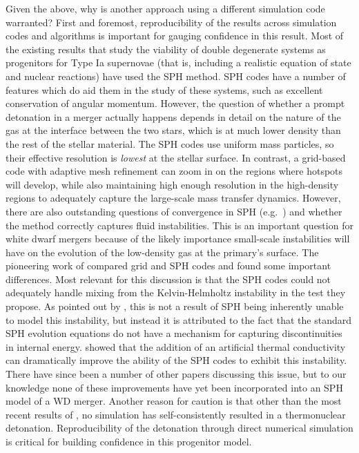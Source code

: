 \documentclass[iop]{../emulateapj}
\begin{document}
Given the above, why is another approach using a different simulation
code warranted? First and foremost, reproducibility of the results
across simulation codes and algorithms is important for gauging
confidence in this result. Most of the existing results that study 
the viability of double degenerate systems as progenitors for
Type Ia supernovae (that is, including a realistic 
equation of state and nuclear reactions) have
used the SPH method. SPH codes have a number of features which do aid
them in the study of these systems, such as excellent conservation of
angular momentum. However, the question of whether a prompt detonation
in a merger actually happens depends in detail on the nature of the
gas at the interface between the two stars, which is at much lower
density than the rest of the stellar material. The SPH codes use
uniform mass particles, so their effective resolution is
\textit{lowest} at the stellar surface. In contrast, a grid-based code
with adaptive mesh refinement can zoom in on the regions where
hotspots will develop, while also maintaining high enough resolution
in the high-density regions to adequately capture the large-scale mass
transfer dynamics. However, there are also outstanding questions of
convergence in SPH (e.g.\ \citealt{zhu_SPH:2014}) and whether the method
correctly captures fluid instabilities. This is an important question
for white dwarf mergers because of the likely importance small-scale
instabilities will have on the evolution of the low-density gas at the
primary's surface. The pioneering work of \cite{agertz:2007} compared
grid and SPH codes and found some important differences. Most relevant
for this discussion is that the SPH codes could not adequately handle
mixing from the Kelvin-Helmholtz instability in the test they
propose. As pointed out by \cite{price:2008}, this is not a result of
SPH being inherently unable to model this instability, but instead it
is attributed to the fact that the standard SPH evolution equations do
not have a mechanism for capturing discontinuities in internal
energy. \citeauthor{price:2008} showed that the addition of an
artificial thermal conductivity can dramatically improve the ability
of the SPH codes to exhibit this instability. There have since been a
number of other papers discussing this issue, but to our knowledge
none of these improvements have yet been incorporated into an SPH
model of a WD merger. Another reason for caution is that other than the
most recent results of \cite{kashyap:2015}, no simulation has self-consistently
resulted in a thermonuclear detonation. Reproducibility of the detonation 
through direct numerical simulation is critical for building 
confidence in this progenitor model.
\end{document}
